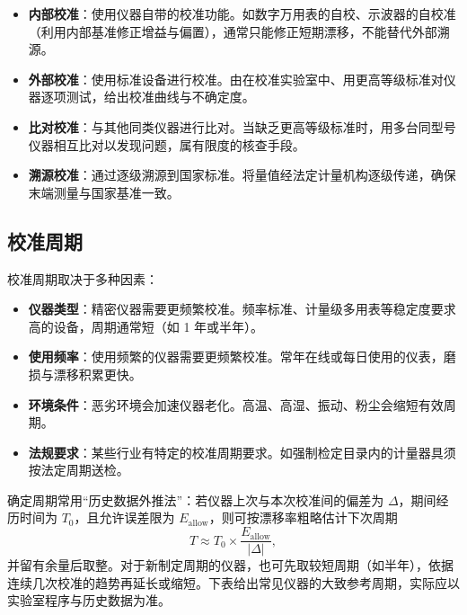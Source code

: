 \begin{itemize}
    \item \textbf{内部校准}：使用仪器自带的校准功能。如数字万用表的自校、示波器的自校准（利用内部基准修正增益与偏置），通常只能修正短期漂移，不能替代外部溯源。
    \item \textbf{外部校准}：使用标准设备进行校准。由在校准实验室中、用更高等级标准对仪器逐项测试，给出校准曲线与不确定度。
    \item \textbf{比对校准}：与其他同类仪器进行比对。当缺乏更高等级标准时，用多台同型号仪器相互比对以发现问题，属有限度的核查手段。
    \item \textbf{溯源校准}：通过逐级溯源到国家标准。将量值经法定计量机构逐级传递，确保末端测量与国家基准一致。
\end{itemize}

\subsection{校准周期}

校准周期取决于多种因素：

\begin{itemize}
    \item \textbf{仪器类型}：精密仪器需要更频繁校准。频率标准、计量级多用表等稳定度要求高的设备，周期通常短（如 1 年或半年）。
    \item \textbf{使用频率}：使用频繁的仪器需要更频繁校准。常年在线或每日使用的仪表，磨损与漂移积累更快。
    \item \textbf{环境条件}：恶劣环境会加速仪器老化。高温、高湿、振动、粉尘会缩短有效周期。
    \item \textbf{法规要求}：某些行业有特定的校准周期要求。如强制检定目录内的计量器具须按法定周期送检。
\end{itemize}

确定周期常用“历史数据外推法”：若仪器上次与本次校准间的偏差为 $\Delta$，期间经历时间为 $T_0$，且允许误差限为 $E_{\mathrm{allow}}$，则可按漂移率粗略估计下次周期
\[
    T \approx T_0 \times \frac{E_{\mathrm{allow}}}{|\Delta|} ,
\]
并留有余量后取整。对于新制定周期的仪器，也可先取较短周期（如半年），依据连续几次校准的趋势再延长或缩短。下表给出常见仪器的大致参考周期，实际应以实验室程序与历史数据为准。

